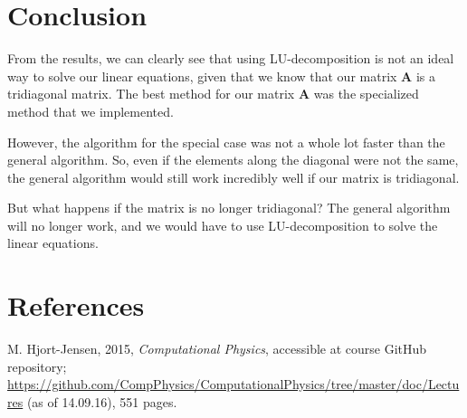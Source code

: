 \documentclass[12pt]{article}
\begin{document}
\section{Conclusion}
From the results, we can clearly see that using LU-decomposition is not an ideal way to solve our linear equations, given that we know that our matrix $\mathbf{A}$ is a tridiagonal matrix. The best method for our matrix $\mathbf{A}$ was the specialized method that we implemented. 

However, the algorithm for the special case was not a whole lot faster than the general algorithm. So, even if the elements along the diagonal were not the same, the general algorithm would still work incredibly well if our matrix is tridiagonal.

But what happens if the matrix is no longer tridiagonal? The general algorithm will no longer work, and we would have to use LU-decomposition to solve the linear equations.
\section{References}
M. Hjort-Jensen, 2015, \textit{Computational Physics}, accessible at course GitHub repository; \url{https://github.com/CompPhysics/ComputationalPhysics/tree/master/doc/Lectures} (as of 14.09.16), 551 pages.
\end{document}
